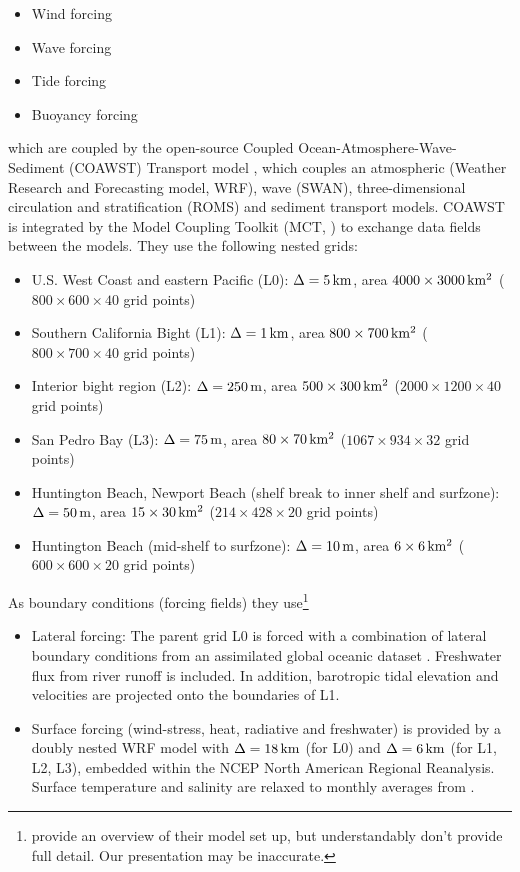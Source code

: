 \documentclass[12pt,a4paper]{article}
\begin{document}
\begin{itemize}
	\item Wind forcing
	\item Wave forcing
	\item Tide forcing
	\item Buoyancy forcing
\end{itemize}

which are coupled by the open-source Coupled Ocean-Atmosphere-Wave-Sediment (COAWST) Transport model \citep{warner2008using,web:coawst}, which couples an atmospheric (Weather Research and Forecasting model, WRF), wave (SWAN), three-dimensional circulation and stratification (ROMS) and sediment transport models. COAWST is integrated by the Model Coupling Toolkit (MCT, \citealt{web:mct}) to exchange data fields between the models. They use the following nested grids:

\begin{itemize}
	\item U.S. West Coast and eastern Pacific (L0):  $\Delta=5\,\rm km$, area $4000\times3000\,\rm km^2$ ($800\times600\times40$ grid points)
	\item Southern California Bight (L1):  $\Delta=1\,\rm km$, area $800\times700\,\rm km^2$ ($800\times700\times40$ grid points)
	\item Interior bight region (L2): $\Delta=250\,\rm m$, area $500\times300\,\rm km^2$ ($2000\times1200\times40$ grid points)
	\item San Pedro Bay (L3): $\Delta=75\,\rm m$, area $80\times70\,\rm km^2$ ($1067\times934\times32$ grid points)
	\item Huntington Beach, Newport Beach (shelf break to inner shelf and surfzone): $\Delta=50\,\rm m$, area $15\times30\,\rm km^2$ ($214\times428\times20$ grid points)
	\item Huntington Beach (mid-shelf to surfzone): $\Delta=10\,\rm m$, area $6\times6\,\rm km^2$ ($600\times600\times20$ grid points)
\end{itemize}

 As boundary conditions (forcing fields) they use\footnote{\cite{kumar2015midshelf} provide an overview of their model set up, but understandably don't provide full detail. Our presentation may be inaccurate.}

\begin{itemize}
	\item Lateral forcing: The parent grid L0 is forced with a combination of lateral boundary conditions from an assimilated global oceanic dataset \citep{carton2008reanalysis}. Freshwater flux from river runoff is included. In addition, barotropic tidal elevation and velocities are projected onto the boundaries of L1.
	
	\item Surface forcing (wind-stress, heat, radiative and freshwater) is provided by a doubly nested WRF model with $\Delta=18\,\rm km$ (for L0) and $\Delta=6\,\rm km$ (for L1, L2, L3), embedded within the NCEP North American Regional Reanalysis. Surface temperature and salinity are relaxed to monthly averages from \cite{carton2008reanalysis}.
	
\end{itemize}
\end{document}
